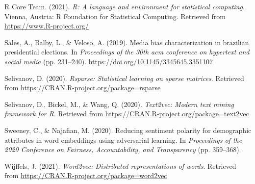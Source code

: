 \documentclass[english,man,mask]{apa6}
\begin{document}
\leavevmode\hypertarget{ref-rcore}{}%
R Core Team. (2021). \emph{R: A language and environment for statistical computing}. Vienna, Austria: R Foundation for Statistical Computing. Retrieved from \url{https://www.R-project.org/}

\leavevmode\hypertarget{ref-sales2019media}{}%
Sales, A., Balby, L., \& Veloso, A. (2019). Media bias characterization in brazilian presidential elections. In \emph{Proceedings of the 30th acm conference on hypertext and social media} (pp. 231--240). \url{https://doi.org/10.1145/3345645.3351107}

\leavevmode\hypertarget{ref-rsparse}{}%
Selivanov, D. (2020). \emph{Rsparse: Statistical learning on sparse matrices}. Retrieved from \url{https://CRAN.R-project.org/package=rsparse}

\leavevmode\hypertarget{ref-selivanov2020tex2vec}{}%
Selivanov, D., Bickel, M., \& Wang, Q. (2020). \emph{Text2vec: Modern text mining framework for R}. Retrieved from \url{https://CRAN.R-project.org/package=text2vec}

\leavevmode\hypertarget{ref-sweeney2020reducing}{}%
Sweeney, C., \& Najafian, M. (2020). Reducing sentiment polarity for demographic attributes in word embeddings using adversarial learning. In \emph{Proceedings of the 2020 Conference on Fairness, Accountability, and Transparency} (pp. 359--368).

\leavevmode\hypertarget{ref-wijffelsword2vec}{}%
Wijffels, J. (2021). \emph{Word2vec: Distributed representations of words}. Retrieved from \url{https://CRAN.R-project.org/package=word2vec}

\endgroup
\end{document}
